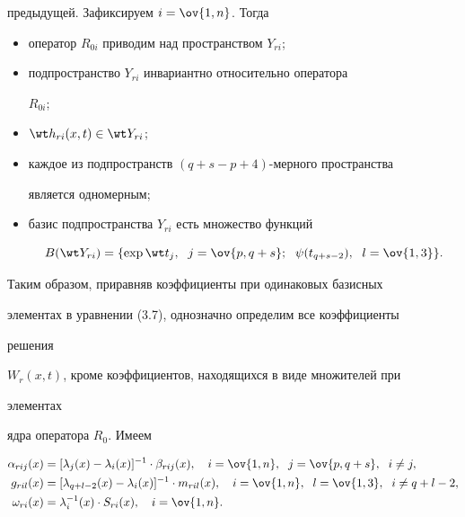 предыдущей. Зафиксируем $i=\ov{1,n}$. Тогда 


\begin{itemize} 


\item[1)] оператор $R_{0i}$ приводим над пространством $Y_{ri}$; 


\item[2)] подпространство $Y_{ri}$ инвариантно относительно оператора 


$R_{0i}$; 


\item[3)] $\wt h_{ri}(x,t)\in\wt Y_{ri}$; 


\item[4)] каждое из подпространств $(q+s-p+4)$-мерного пространства 


является одномерным;  


\item[5)] базис подпространства $Y_{ri}$ есть множество функций 


$$ 


B(\wt Y_{ri})=\{\exp\wt t_j,\ \;j=\ov{p,q+s};\ \; 


\psi(t_{q+s-2}),\ \; l=\ov{1,3}\}. 


$$ 


\end{itemize} 


 


Таким образом, приравняв коэффициенты при одинаковых базисных 


элементах в уравнении (3.7), однозначно определим все коэффициенты 


решения 


$W_r(x,t)$, кроме коэффициентов, находящихся в виде множителей при 


элементах 


ядра оператора $R_0$. Имеем 


\begin{align} 


\alpha_{rij}(x)&=[\lambda_j(x)-\lambda_i(x)]^{-1}\cdot


\beta_{rij}(x),\quad i=\ov{1,n},\ \;j=\ov{p,q+s},\ \; i\ne j,\\ 


% 


g_{ril}(x)&=[\lambda_{q+l-2}(x)-\lambda_i(x)]^{-1}\cdot


m_{ril}(x),\quad i=\ov{1,n},\ \; l=\ov{1,3},\ \;i\ne q+l-2, \\ 


% 


\omega_{ri}(x)&=\lambda^{-1}_i(x)\cdot S_{ri}(x),\quad i=\ov{1,n}. 


\end{align} 



